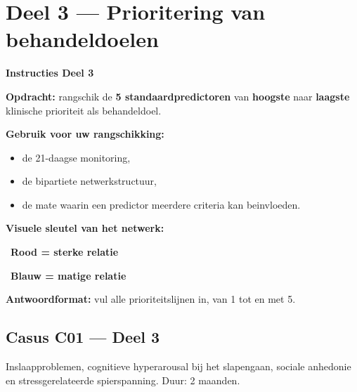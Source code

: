 \documentclass[11pt,a4paper]{article}
\begin{document}
\vspace{0.6em}
\newpage


\section{Deel 3 --- Prioritering van behandeldoelen}

\begin{tcolorbox}[colback=yellow!5,colframe=GoldAmber,arc=2.5mm,boxrule=0.9pt,
  left=10pt,right=10pt,top=9pt,bottom=9pt]
\textbf{\color{GoldAmber}Instructies Deel 3}

\smallskip\small
\textbf{Opdracht:} rangschik de \textbf{5 standaardpredictoren} van \textbf{hoogste} naar \textbf{laagste}
klinische prioriteit als behandeldoel.

\textbf{Gebruik voor uw rangschikking:}
\begin{itemize}[topsep=2pt,itemsep=1pt]
\item de 21-daagse monitoring,
\item de bipartiete netwerkstructuur,
\item de mate waarin een predictor meerdere criteria kan beinvloeden.
\end{itemize}

\textbf{Visuele sleutel van het netwerk:}
\begin{center}
~\textbf{Rood = sterke relatie}\qquad
{}~\textbf{Blauw = matige relatie}
\end{center}

\textbf{Antwoordformat:} vul alle prioriteitslijnen in, van 1 tot en met 5.
\end{tcolorbox}

\vspace{0.5em}
\subsection*{Casus C01 --- Deel 3}

\begin{complaintbox}[title={Casus C01 --- 28-jarige softwareontwikkelaar}]
\small Inslaapproblemen, cognitieve hyperarousal bij het slapengaan, sociale anhedonie en stressgerelateerde spierspanning. Duur: 2 maanden.
\end{complaintbox}
\end{document}
